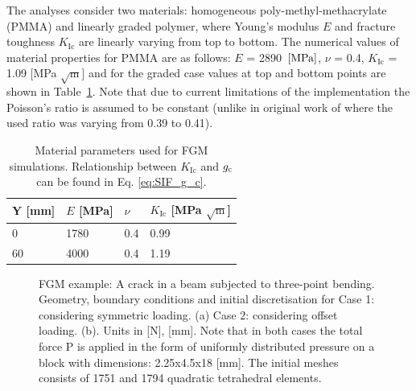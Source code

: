 \documentclass[onecolumn]{svjour3}
\begin{document}
The analyses consider two materials: homogeneous poly-methyl-methacrylate (PMMA) and linearly graded polymer, where Young's modulus $E$ and fracture toughness $K_\mathrm{Ic}$ are linearly varying from top to bottom. The numerical values of material properties for PMMA are as follows: $E$ = 2890~${\rm {[MPa]}}$, $\nu$ = 0.4,  $K_\mathrm{Ic}$ = 1.09 [MPa $\sqrt{\mathrm m}$] and for the graded case values at top and bottom points are shown in Table~\ref{tab:parameters_fgm}. Note that due to current limitations of the implementation the Poisson's ratio is assumed to be constant (unlike in original work of \cite{kim2004simulation} where the used ratio was varying from 0.39 to 0.41). 
% 
\begin{table}[h]
	\centering
	\begin{tabular}{llll}
		\hline
		Y [mm]            \hspace{1.0cm} 	&  $E$ [MPa] \hspace{1.0cm} & $\nu$    \hspace{1.0cm}     & $K_\mathrm{Ic}$ [MPa $\sqrt{\mathrm m}$]  \\ \hline
		$0  $              \hspace{1.0cm}   &  1780  	 \hspace{1.0cm}	& 0.4      \hspace{1.0cm}  		&  0.99\\
		$60  $            \hspace{1.0cm}   &  4000  	 \hspace{1.0cm}	& 0.4      \hspace{1.0cm}     &  1.19 \\
		\hline
	\end{tabular} 
	\caption{Material parameters used for FGM simulations. Relationship between $K_\mathrm{Ic}$ and $g_{\rm c}$ can be found in Eq. \ref{eq:SIF_g_c}.}
	\label{tab:parameters_fgm}
\end{table}
% 
% 
% 
\begin{figure}[h!]
	\centering
	\begin{center}
	\def\svgwidth{12cm} 
	\caption{FGM example: A crack in a beam subjected to three-point bending. Geometry, boundary conditions and initial discretisation for Case 1: considering symmetric loading. (a) Case 2: considering offset loading. (b). Units in [N], [mm]. Note that in both cases the total force P is applied in the form of uniformly distributed pressure on a block with dimensions: 2.25x4.5x18 [mm]. The initial meshes consists of 1751 and 1794 quadratic tetrahedral elements.}
	\label{fig:fgm_mesh_load}
	\end{center}
\end{figure}
% 
\end{document}
